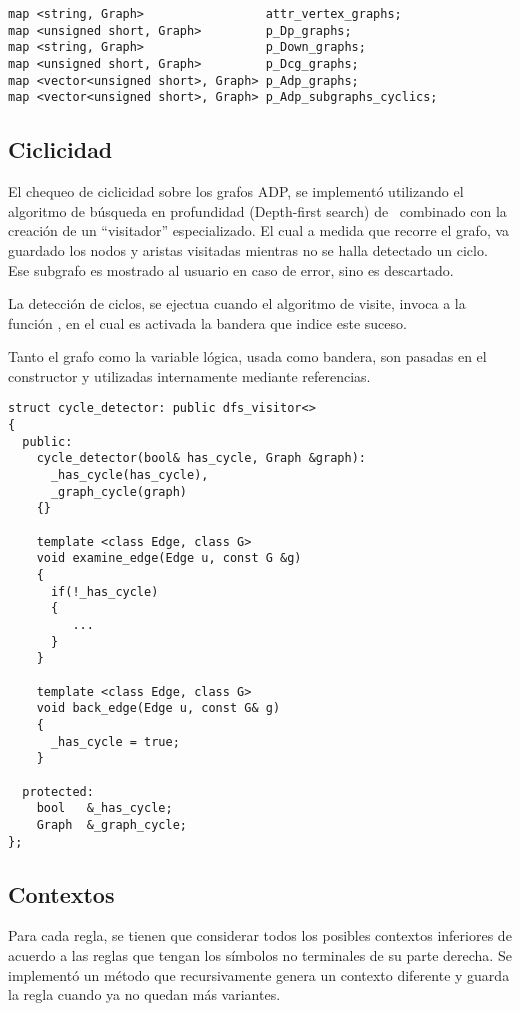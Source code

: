 \begin{lstlisting}[basicstyle=\scriptsize, linewidth=10.7cm]
map <string, Graph>                 attr_vertex_graphs;
map <unsigned short, Graph>         p_Dp_graphs;
map <string, Graph>                 p_Down_graphs;
map <unsigned short, Graph>         p_Dcg_graphs;
map <vector<unsigned short>, Graph> p_Adp_graphs;
map <vector<unsigned short>, Graph> p_Adp_subgraphs_cyclics;
\end{lstlisting}

\subsection{Ciclicidad}

El chequeo de ciclicidad sobre los grafos ADP, se implementó utilizando el algoritmo de búsqueda en profundidad (Depth-first search) de \boost\ combinado con la creación de un ``visitador'' especializado. El cual a medida que recorre el grafo, va guardado los nodos y aristas visitadas mientras no se halla detectado un ciclo. Ese subgrafo es mostrado al usuario en caso de error, sino es descartado.

La detección de ciclos, se ejectua cuando el algoritmo de visite, invoca a la función , en el cual es activada la bandera que indice este suceso.

Tanto el grafo como la variable lógica, usada como bandera, son pasadas en el constructor y utilizadas internamente mediante referencias.

\begin{lstlisting}[columns=fullflexible, linewidth=9.2cm]
struct cycle_detector: public dfs_visitor<>
{
  public:
    cycle_detector(bool& has_cycle, Graph &graph):
      _has_cycle(has_cycle), 
      _graph_cycle(graph)
    {}

    template <class Edge, class G>
    void examine_edge(Edge u, const G &g)
    {
      if(!_has_cycle)
      {
         ...
      }
    }

    template <class Edge, class G>
    void back_edge(Edge u, const G& g)
    {
      _has_cycle = true;
    }

  protected:
    bool   &_has_cycle;
    Graph  &_graph_cycle;
};
\end{lstlisting}

\subsection{Contextos}

Para cada regla, se tienen que considerar todos los posibles contextos inferiores de acuerdo a las reglas que tengan los símbolos no terminales de su parte derecha. Se implementó un método que recursivamente genera un contexto diferente y guarda la regla cuando ya no quedan más variantes.

